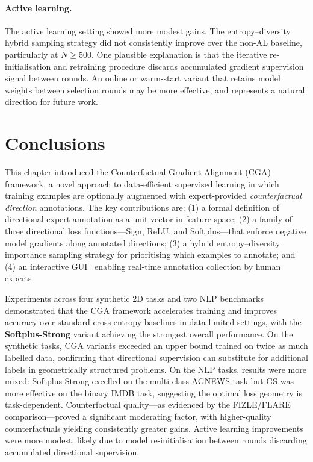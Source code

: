 \paragraph{Active learning.}
The active learning setting showed more modest gains. The entropy--diversity hybrid sampling strategy did not consistently improve over the non-AL baseline, particularly at $N \geq 500$. One plausible explanation is that the iterative re-initialisation and retraining procedure discards accumulated gradient supervision signal between rounds. An online or warm-start variant that retains model weights between selection rounds may be more effective, and represents a natural direction for future work.



\section{Conclusions}
\label{sec:conclusions}
This chapter introduced the Counterfactual Gradient Alignment (CGA) framework, a novel approach to data-efficient supervised learning in which training examples are optionally augmented with expert-provided \emph{counterfactual direction} annotations. The key contributions are: (1) a formal definition of directional expert annotation as a unit vector in feature space; (2) a family of three directional loss functions---Sign, ReLU, and Softplus---that enforce negative model gradients along annotated directions; (3) a hybrid entropy--diversity importance sampling strategy for prioritising which examples to annotate; and (4) an interactive GUI~\cite{erskine2024ijcai} enabling real-time annotation collection by human experts.

Experiments across four synthetic 2D tasks and two NLP benchmarks demonstrated that the CGA framework accelerates training and improves accuracy over standard cross-entropy baselines in data-limited settings, with the \textbf{Softplus-Strong} variant achieving the strongest overall performance. On the synthetic tasks, CGA variants exceeded an upper bound trained on twice as much labelled data, confirming that directional supervision can substitute for additional labels in geometrically structured problems. On the NLP tasks, results were more mixed: Softplus-Strong excelled on the multi-class AGNEWS task but GS was more effective on the binary IMDB task, suggesting the optimal loss geometry is task-dependent. Counterfactual quality---as evidenced by the FIZLE/FLARE comparison---proved a significant moderating factor, with higher-quality counterfactuals yielding consistently greater gains. Active learning improvements were more modest, likely due to model re-initialisation between rounds discarding accumulated directional supervision.

